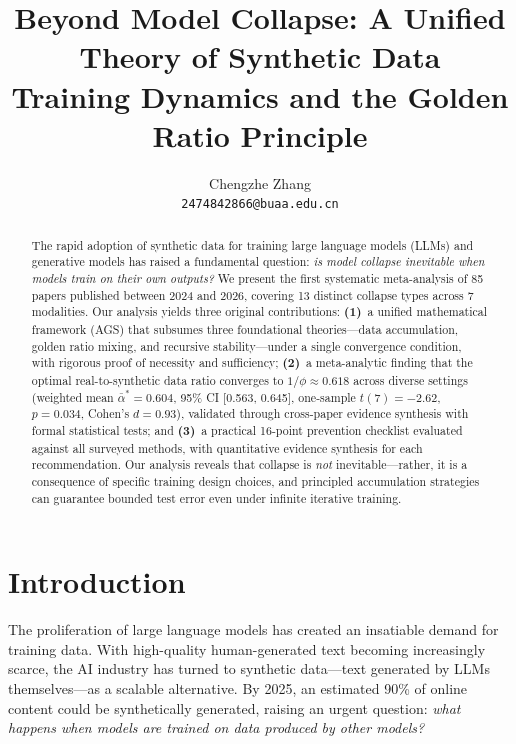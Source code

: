 \documentclass[11pt]{article}
\title{Beyond Model Collapse: A Unified Theory of Synthetic Data \\ Training Dynamics and the Golden Ratio Principle}
\author{
  Chengzhe Zhang \\
  \texttt{2474842866@buaa.edu.cn}
}
\date{}
\newcommand{\varph}{\phi}
\begin{document}
\maketitle

\begin{abstract}
The rapid adoption of synthetic data for training large language models (LLMs) and generative models has raised a fundamental question: \textit{is model collapse inevitable when models train on their own outputs?} We present the first systematic meta-analysis of 85 papers published between 2024 and 2026, covering 13 distinct collapse types across 7 modalities. Our analysis yields three original contributions: \textbf{(1)}~a unified mathematical framework (AGS) that subsumes three foundational theories---data accumulation, golden ratio mixing, and recursive stability---under a single convergence condition, with rigorous proof of necessity and sufficiency; \textbf{(2)}~a meta-analytic finding that the optimal real-to-synthetic data ratio converges to $1/\varph \approx 0.618$ across diverse settings (weighted mean $\bar{\alpha}^* = 0.604$, 95\% CI [0.563, 0.645], one-sample $t(7) = -2.62$, $p = 0.034$, Cohen's $d = 0.93$), validated through cross-paper evidence synthesis with formal statistical tests; and \textbf{(3)}~a practical 16-point prevention checklist evaluated against all surveyed methods, with quantitative evidence synthesis for each recommendation. Our analysis reveals that collapse is \textit{not} inevitable---rather, it is a consequence of specific training design choices, and principled accumulation strategies can guarantee bounded test error even under infinite iterative training.
\end{abstract}

\section{Introduction}
\label{sec:intro}

The proliferation of large language models has created an insatiable demand for training data. With high-quality human-generated text becoming increasingly scarce, the AI industry has turned to synthetic data---text generated by LLMs themselves---as a scalable alternative. By 2025, an estimated 90\% of online content could be synthetically generated, raising an urgent question: \textit{what happens when models are trained on data produced by other models?}
\end{document}
